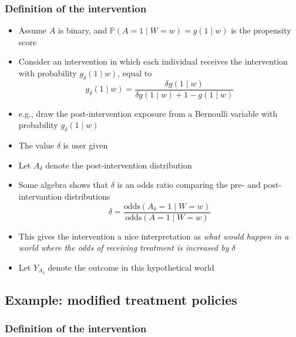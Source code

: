 \documentclass[
  12pt,
]{book}
\providecommand{\tightlist}{%
  \setlength{\itemsep}{0pt}\setlength{\parskip}{0pt}}
\theoremstyle{definition}
\theoremstyle{definition}
\theoremstyle{definition}
\renewcommand{\P}{\mathbb{P}}
\newcommand{\1}{\mathbbm{1}}
\begin{document}
\hypertarget{definition-of-the-intervention}{%
\subsubsection*{Definition of the intervention}\label{definition-of-the-intervention}}


\begin{itemize}
\tightlist
\item
  Assume \(A\) is binary, and \(\P(A=1\mid W=w) = g(1\mid w)\) is the propensity score
\item
  Consider an intervention in which each individual receives the intervention
  with probability \(g_\delta(1\mid w)\), equal to
  \begin{equation*}
    g_\delta(1\mid w)=\frac{\delta g(1\mid w)}{\delta g(1\mid w) +
    1 - g(1\mid w)}
  \end{equation*}
\item
  e.g., draw the post-intervention exposure from a Bernoulli variable with
  probability \(g_\delta(1\mid w)\)
\item
  The value \(\delta\) is user given
\item
  Let \(A_\delta\) denote the post-intervention distribution
\item
  Some algebra shows that \(\delta\) is an odds ratio comparing the pre- and
  post-intervantion distributions
  \begin{equation*}
    \delta = \frac{\text{odds}(A_\delta = 1\mid W=w)}
    {\text{odds}(A = 1\mid W=w)}
  \end{equation*}
\item
  This gives the intervention a nice interpretation as \emph{what would happen in a
  world where the odds of receiving treatment is increased by \(\delta\)}
\item
  Let \(Y_{A_\delta}\) denote the outcome in this hypothetical world
\end{itemize}

\hypertarget{example-modified-treatment-policies}{%
\subsection{Example: modified treatment policies}\label{example-modified-treatment-policies}}

\hypertarget{definition-of-the-intervention-1}{%
\subsubsection*{Definition of the intervention}\label{definition-of-the-intervention-1}}
\end{document}
